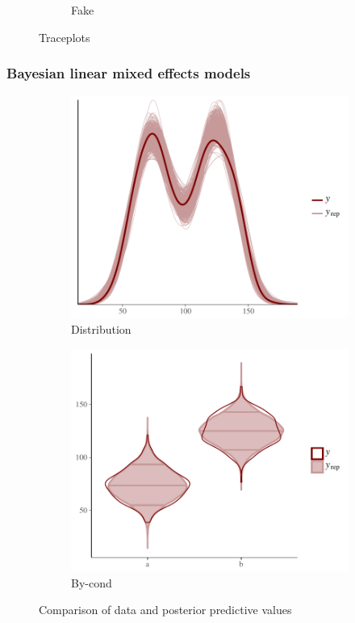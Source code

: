 \begin{frame}
\begin{minipage}{.4\textwidth}
{\begin{figure}
\begin{subfigure}[b]{1\textwidth}
{							\caption{Fake}	
						}
						\end{subfigure}
			\caption{Traceplots}
		\end{figure}
	}
		\end{minipage}
		

\end{frame}

\begin{frame}
	\frametitle{Bayesian linear mixed effects models}
	
		\begin{figure}
			\centering
			\begin{subfigure}[b]{.45\textwidth}
				\centering
				\includegraphics[scale =.4]{gfx/overlay.pdf}
				\caption{Distribution}	
			\end{subfigure}
			\hfill
			\begin{subfigure}[b]{.45\textwidth}
				\centering
				\includegraphics[scale =.4]{gfx/overlaycond.pdf}
				\caption{By-cond}	
			\end{subfigure}
			\caption{Comparison of data and posterior predictive values}
		\end{figure}
	
	
\end{frame}
